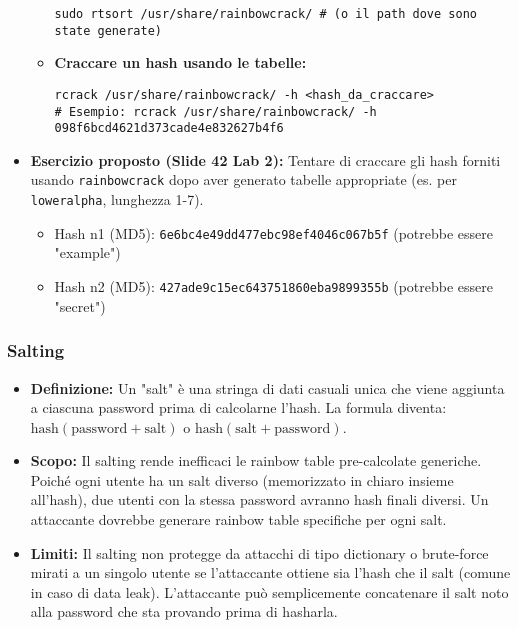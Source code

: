 \begin{itemize}
\begin{itemize}
\begin{verbatim}
sudo rtsort /usr/share/rainbowcrack/ # (o il path dove sono state generate)
\end{verbatim}
        \item \textbf{Craccare un hash usando le tabelle:}
\begin{verbatim}
rcrack /usr/share/rainbowcrack/ -h <hash_da_craccare>
# Esempio: rcrack /usr/share/rainbowcrack/ -h 098f6bcd4621d373cade4e832627b4f6
\end{verbatim}
    \end{itemize}
    \item \textbf{Esercizio proposto (Slide 42 Lab 2):}
    Tentare di craccare gli hash forniti usando \texttt{rainbowcrack} dopo aver generato tabelle appropriate (es. per \texttt{loweralpha}, lunghezza 1-7).
    \begin{itemize}
        \item Hash n1 (MD5): \texttt{6e6bc4e49dd477ebc98ef4046c067b5f} (potrebbe essere "example")
        \item Hash n2 (MD5): \texttt{427ade9c15ec643751860eba9899355b} (potrebbe essere "secret")
    \end{itemize}
\end{itemize}

\subsubsection{Salting}
\begin{itemize}
    \item \textbf{Definizione:} Un "salt" è una stringa di dati casuali unica che viene aggiunta a ciascuna password prima di calcolarne l'hash. La formula diventa: \(\text{hash}(\text{password} + \text{salt})\) o \(\text{hash}(\text{salt} + \text{password})\).
    \item \textbf{Scopo:} Il salting rende inefficaci le rainbow table pre-calcolate generiche. Poiché ogni utente ha un salt diverso (memorizzato in chiaro insieme all'hash), due utenti con la stessa password avranno hash finali diversi. Un attaccante dovrebbe generare rainbow table specifiche per ogni salt.
    \item \textbf{Limiti:} Il salting non protegge da attacchi di tipo dictionary o brute-force mirati a un singolo utente se l'attaccante ottiene sia l'hash che il salt (comune in caso di data leak). L'attaccante può semplicemente concatenare il salt noto alla password che sta provando prima di hasharla.
\end{itemize}

